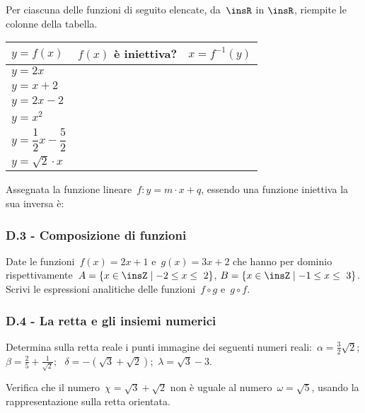 \begin{esercizio}
 \label{ese:D.12}
Per ciascuna delle funzioni di seguito elencate, da~$\insR$ in $\insR$, riempite le colonne della tabella.
\begin{center}
\begin{tabular}{l*2{c}}
\toprule
$y=f(x)$ & $f(x)$ è iniettiva? & $x=f^{-1}(y)$\\
\midrule
$y=2x$ & & \\
$y=x+2$ & & \\
$y=2x-2$ & & \\
$y=x^{2}$ & & \\
$y=\dfrac{1}{2}x-\dfrac{5}{2}$ & & \\
$y=\sqrt{2}\cdot x$ & & \\
\bottomrule
\end{tabular}
\end{center}
\end{esercizio}

\begin{esercizio}
 \label{ese:D.13}
Assegnata la funzione lineare~$f:y=m\cdot x+q$, essendo una funzione
iniettiva la sua inversa è:\dotfill
\end{esercizio}

\subsubsection*{D.3 - Composizione di funzioni}
\begin{esercizio}
 \label{ese:D.14}
Date le funzioni~$f(x)=2x+1$ e~$g(x)=3x+2$ che hanno per dominio
rispettivamente~$A=\left\{x\in \insZ\mid -2\le x\le~2\right\}$,
$B=\left\{x\in \insZ\mid -1\le x\le~3\right\}$.
Scrivi le espressioni analitiche delle funzioni~$f\circ g$ e~$g\circ f$.
\end{esercizio}

\subsubsection*{D.4 - La retta e gli insiemi numerici}

\begin{esercizio}
\label{ese:D.15}
Determina sulla retta reale i punti immagine dei seguenti numeri reali:~$\alpha =\frac{3}{2}\sqrt{2}$;\, $\beta =\frac{2}{5}+\frac{1}{\sqrt{2}}$;
\, $\delta =-\left(\sqrt{3}+\sqrt{2}\right)$;\, $\lambda =\sqrt{3}-3$.
\end{esercizio}

\begin{esercizio}
\label{ese:D.16}
Verifica che il numero~$\chi =\sqrt{3}+\sqrt{2}$ non è uguale al numero~$\omega =\sqrt{5}$, usando la rappresentazione sulla retta orientata.
\end{esercizio}

